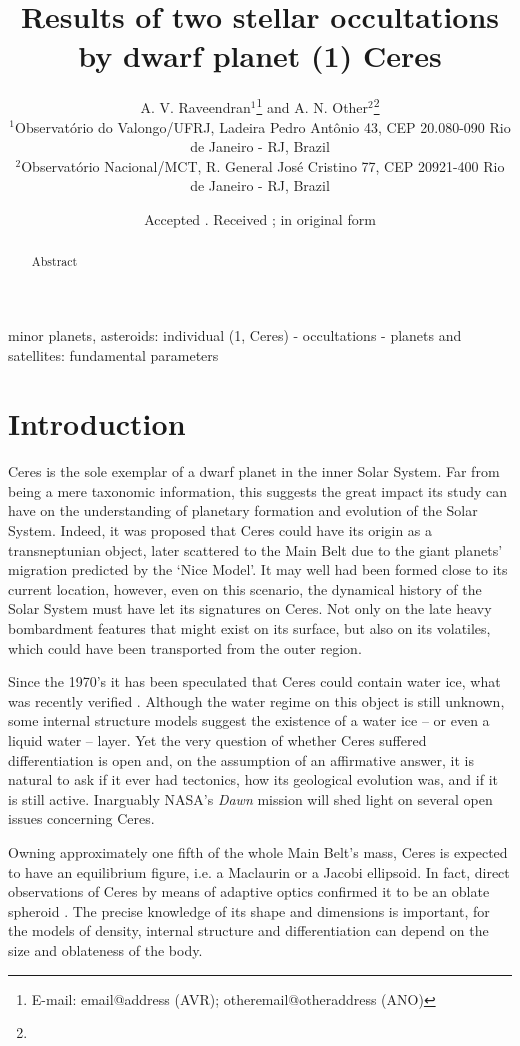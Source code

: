 \documentclass[useAMS,usenatbib]{mn2e}
\title[Results of two stellar occultations by Ceres]{Results of two stellar occultations by dwarf planet (1) Ceres}
\author[A. V. Raveendran and A. N. Other]{A. V. Raveendran$^{1}$\thanks{E-mail:
email@address (AVR); otheremail@otheraddress (ANO)} and A. N.
Other$^{2}$\footnotemark[1]\thanks{}\\
$^{1}$Observat\'orio do Valongo/UFRJ, Ladeira Pedro Ant\^onio 43,
CEP 20.080-090 Rio de Janeiro - RJ, Brazil\\
$^{2}$Observat\'orio Nacional/MCT, R. General Jos\'e Cristino 77,
CEP 20921-400 Rio de Janeiro - RJ, Brazil}
\begin{document}
\date{Accepted . Received ; in original form }

\pagerange{\pageref{firstpage}--\pageref{lastpage}} 

\maketitle

\label{firstpage}

\begin{abstract}
Abstract
\end{abstract}

\begin{keywords}
minor planets, asteroids: individual (1, Ceres) - occultations - planets and satellites: fundamental parameters
\end{keywords}

\section{Introduction}

Ceres is the sole exemplar of a dwarf planet in the inner Solar System. Far from being a mere taxonomic information, this suggests the great impact its study can have on the understanding of planetary formation and evolution of the Solar System. Indeed, it was proposed that Ceres could have its origin as a transneptunian object, later scattered to the Main Belt due to the giant planets' migration predicted by the `Nice Model'. It may well had been formed close to its current location, however, even on this scenario, the dynamical history of the Solar System must have let its signatures on Ceres. Not only on the late heavy bombardment features that might exist on its surface, but also on its volatiles, which could have been transported from the outer region.

Since the 1970's it has been speculated that Ceres could contain water ice, what was recently verified \citep{Kuppers2014}. Although the water regime on this object is still unknown, some internal structure models suggest the existence of a water ice -- or even a liquid water -- layer. Yet the very question of whether Ceres suffered differentiation is open and, on the assumption of an affirmative answer, it is natural to ask if it ever had tectonics, how its geological evolution was, and if it is still active. Inarguably NASA's \textit{Dawn} mission will shed light on several open issues concerning Ceres.

Owning approximately one fifth of the whole Main Belt's mass, Ceres is expected to have an equilibrium figure, i.e. a Maclaurin or a Jacobi ellipsoid. In fact, direct observations of Ceres by means of adaptive optics confirmed it to be an oblate spheroid \citep{Drummond2014}. The precise knowledge of its shape and dimensions is important, for the models of density, internal structure and differentiation can depend on the size and oblateness of the body.
\end{document}
